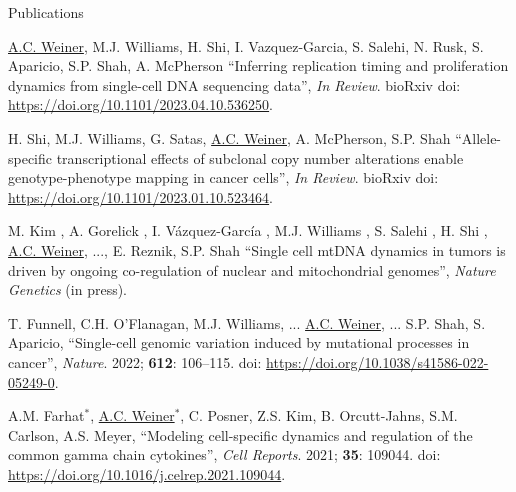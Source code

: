 \documentclass{resume} %
\begin{document}
\begin{rSection}{Publications}

\underline{A.C. Weiner}, M.J. Williams, H. Shi, I. Vazquez-Garcia, S. Salehi, N. Rusk, S. Aparicio, S.P. Shah, A. McPherson ``Inferring replication timing and proliferation dynamics from single-cell DNA sequencing data'', \textit{In Review}. bioRxiv doi: \url{https://doi.org/10.1101/2023.04.10.536250}.

H. Shi, M.J. Williams, G. Satas, \underline{A.C. Weiner}, A. McPherson, S.P. Shah ``Allele-specific transcriptional effects of subclonal copy number alterations enable genotype-phenotype mapping in cancer cells'', \textit{In Review}. bioRxiv doi: \url{https://doi.org/10.1101/2023.01.10.523464}.

M. Kim , A. Gorelick , I. Vázquez-García , M.J. Williams , S. Salehi , H. Shi , \underline{A.C. Weiner}, ..., E. Reznik, S.P. Shah ``Single cell mtDNA dynamics in tumors is driven by ongoing co-regulation of nuclear and mitochondrial genomes'', \textit{Nature Genetics} (in press).

T. Funnell, C.H. O’Flanagan, M.J. Williams, ... \underline{A.C. Weiner}, ... S.P. Shah, S. Aparicio, ``Single-cell genomic variation induced by mutational processes in cancer'', \textit{Nature}. 2022; \textbf{612}: 106–115. doi: \url{https://doi.org/10.1038/s41586-022-05249-0}.


A.M. Farhat$^{\ast}$, \underline{A.C. Weiner}$^{\ast}$, C. Posner, Z.S. Kim, B. Orcutt-Jahns, S.M. Carlson, A.S. Meyer, ``Modeling cell-specific dynamics and regulation of the common gamma chain cytokines'', \textit{Cell Reports}. 2021; \textbf{35}: 109044. doi: \url{https://doi.org/10.1016/j.celrep.2021.109044}.


\end{rSection}

\end{document}
